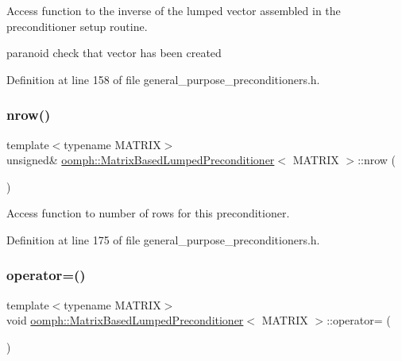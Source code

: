Access function to the inverse of the lumped vector assembled in the preconditioner setup routine. 

paranoid check that vector has been created 

Definition at line 158 of file general\+\_\+purpose\+\_\+preconditioners.\+h.

\mbox{\label{classoomph_1_1MatrixBasedLumpedPreconditioner_ad165843e92c2aac0367afd9bb0ce29b0}} 
\subsubsection{\texorpdfstring{nrow()}{nrow()}}
{\footnotesize\ttfamily template$<$typename M\+A\+T\+R\+IX$>$ \\
unsigned\& \hyperlink{classoomph_1_1MatrixBasedLumpedPreconditioner}{oomph\+::\+Matrix\+Based\+Lumped\+Preconditioner}$<$ M\+A\+T\+R\+IX $>$\+::nrow (\begin{DoxyParamCaption}{ }\end{DoxyParamCaption})\hspace{0.3cm}{\ttfamily [inline]}}



Access function to number of rows for this preconditioner. 



Definition at line 175 of file general\+\_\+purpose\+\_\+preconditioners.\+h.

\mbox{\label{classoomph_1_1MatrixBasedLumpedPreconditioner_a38e5a8816b34c3fce86a441d6df1c33f}} 
\subsubsection{\texorpdfstring{operator=()}{operator=()}}
{\footnotesize\ttfamily template$<$typename M\+A\+T\+R\+IX$>$ \\
void \hyperlink{classoomph_1_1MatrixBasedLumpedPreconditioner}{oomph\+::\+Matrix\+Based\+Lumped\+Preconditioner}$<$ M\+A\+T\+R\+IX $>$\+::operator= (\begin{DoxyParamCaption}\item[{const \hyperlink{classoomph_1_1MatrixBasedLumpedPreconditioner}{Matrix\+Based\+Lumped\+Preconditioner}$<$ M\+A\+T\+R\+IX $>$ \&}]{ }\end{DoxyParamCaption})\hspace{0.3cm}{\ttfamily [inline]}}



